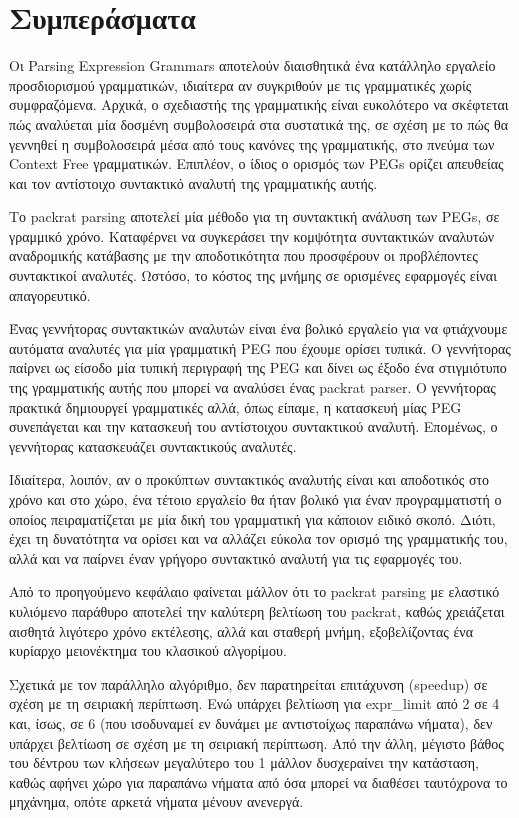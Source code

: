 \chapter{ Συμπεράσματα }
\label{ch:conclusions}

Οι Parsing Expression Grammars αποτελούν διαισθητικά ένα κατάλληλο εργαλείο προσδιορισμού γραμματικών, ιδιαίτερα αν συγκριθούν με τις γραμματικές χωρίς συμφραζόμενα. 
Αρχικά, ο σχεδιαστής της γραμματικής είναι ευκολότερο να σκέφτεται πώς αναλύεται μία δοσμένη συμβολοσειρά στα συστατικά της, σε σχέση με το πώς θα γεννηθεί η συμβολοσειρά μέσα από τους κανόνες της γραμματικής, στο πνεύμα των Context Free γραμματικών.
Επιπλέον, ο ίδιος ο ορισμός των PEGs ορίζει απευθείας και τον αντίστοιχο συντακτικό αναλυτή της γραμματικής αυτής.

Το packrat parsing αποτελεί μία μέθοδο για τη συντακτική ανάλυση των PEGs, σε γραμμικό χρόνο.
Καταφέρνει να συγκεράσει την κομψότητα συντακτικών αναλυτών αναδρομικής κατάβασης με την αποδοτικότητα που προσφέρουν οι προβλέποντες συντακτικοί αναλυτές.
Ωστόσο, το κόστος της μνήμης σε ορισμένες εφαρμογές είναι απαγορευτικό.

Ένας γεννήτορας συντακτικών αναλυτών είναι ένα βολικό εργαλείο για να φτιάχνουμε αυτόματα αναλυτές για μία γραμματική PEG που έχουμε ορίσει τυπικά.
Ο γεννήτορας παίρνει ως είσοδο μία τυπική περιγραφή της PEG και δίνει ως έξοδο ένα στιγμιότυπο της γραμματικής αυτής που μπορεί να αναλύσει ένας packrat parser.
Ο γεννήτορας πρακτικά δημιουργεί γραμματικές αλλά, όπως είπαμε, η κατασκευή μίας PEG συνεπάγεται και την κατασκευή του αντίστοιχου συντακτικού αναλυτή.
Επομένως, ο γεννήτορας κατασκευάζει συντακτικούς αναλυτές.

Ιδιαίτερα, λοιπόν, αν ο προκύπτων συντακτικός αναλυτής είναι και αποδοτικός στο χρόνο και στο χώρο, ένα τέτοιο εργαλείο θα ήταν βολικό για έναν προγραμματιστή ο οποίος πειραματίζεται με μία δική του γραμματική για κάποιον ειδικό σκοπό.
Διότι, έχει τη δυνατότητα να ορίσει και να αλλάζει εύκολα τον ορισμό της γραμματικής του, αλλά και να παίρνει έναν γρήγορο συντακτικό αναλυτή για τις εφαρμογές του.

Από το προηγούμενο κεφάλαιο φαίνεται μάλλον ότι το packrat parsing με ελαστικό κυλιόμενο παράθυρο αποτελεί την καλύτερη βελτίωση του packrat, καθώς χρειάζεται αισθητά λιγότερο χρόνο εκτέλεσης, αλλά και σταθερή μνήμη, εξοβελίζοντας ένα κυρίαρχο μειονέκτημα του κλασικού αλγορίμου.

Σχετικά με τον παράλληλο αλγόριθμο, δεν παρατηρείται επιτάχυνση (speedup) σε σχέση με τη σειριακή περίπτωση.
Ενώ υπάρχει βελτίωση για expr\_limit από 2 σε 4 και, ίσως, σε 6 (που ισοδυναμεί εν δυνάμει με αντιστοίχως παραπάνω νήματα), δεν υπάρχει βελτίωση σε σχέση με τη σειριακή περίπτωση.
Από την άλλη, μέγιστο βάθος του δέντρου των κλήσεων μεγαλύτερο του 1 μάλλον δυσχεραίνει την κατάσταση, καθώς αφήνει χώρο για παραπάνω νήματα από όσα μπορεί να διαθέσει ταυτόχρονα το μηχάνημα, οπότε αρκετά νήματα μένουν ανενεργά.

